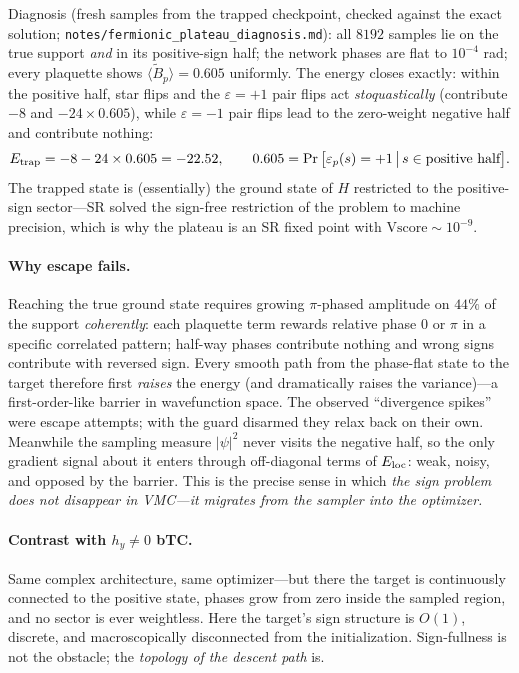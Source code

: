 \documentclass[11pt]{article}
\newcommand{\Bt}{\tilde B_p}
\begin{document}
Diagnosis (fresh samples from the trapped checkpoint, checked against the
exact solution; \texttt{notes/fermionic\_plateau\_diagnosis.md}): all $8192$
samples lie on the true support \emph{and} in its positive-sign half; the
network phases are flat to $10^{-4}$ rad; every plaquette shows
$\langle\Bt\rangle=0.605$ uniformly. The energy closes exactly:
within the positive half, star flips and the $\varepsilon=+1$ pair flips act
\emph{stoquastically} (contribute $-8$ and $-24\times0.605$), while
$\varepsilon=-1$ pair flips lead to the zero-weight negative half and
contribute nothing:
\begin{equation}
E_{\rm trap}=-8-24\times0.605=-22.52,
\qquad
0.605=\Pr\big[\varepsilon_p(s)=+1\,\big|\,s\in\text{positive half}\big].
\end{equation}
The trapped state is (essentially) the ground state of $H$ restricted to the
positive-sign sector---SR solved the sign-free restriction of the problem to
machine precision, which is why the plateau is an SR fixed point with
$\mathrm{Vscore}\sim10^{-9}$.

\paragraph{Why escape fails.}
Reaching the true ground state requires growing $\pi$-phased amplitude on
$44\%$ of the support \emph{coherently}: each plaquette term rewards relative
phase $0$ or $\pi$ in a specific correlated pattern; half-way phases
contribute nothing and wrong signs contribute with reversed sign. Every smooth
path from the phase-flat state to the target therefore first \emph{raises}
the energy (and dramatically raises the variance)---a first-order-like barrier
in wavefunction space. The observed ``divergence spikes'' were escape
attempts; with the guard disarmed they relax back on their own. Meanwhile the
sampling measure $|\psi|^2$ never visits the negative half, so the only
gradient signal about it enters through off-diagonal terms of $E_{\rm loc}$:
weak, noisy, and opposed by the barrier. This is the precise sense in which
\emph{the sign problem does not disappear in VMC---it migrates from the
sampler into the optimizer.}

\paragraph{Contrast with $h_y\neq0$ bTC.}
Same complex architecture, same optimizer---but there the target is
continuously connected to the positive state, phases grow from zero inside the
sampled region, and no sector is ever weightless. Here the target's sign
structure is $O(1)$, discrete, and macroscopically disconnected from the
initialization. Sign-fullness is not the obstacle; the \emph{topology of the
descent path} is.
\end{document}
